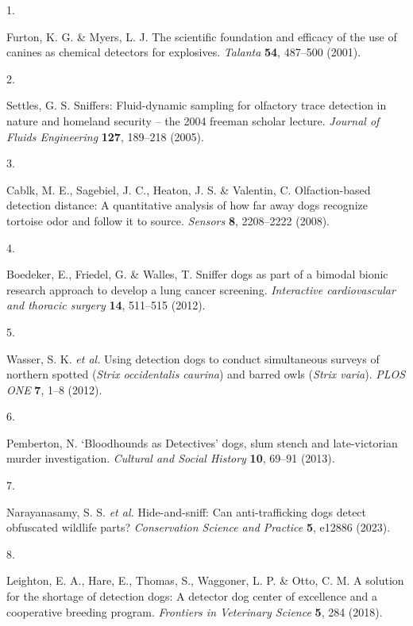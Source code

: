 \documentclass[
]{article}
\newlength{\cslhangindent}
\newlength{\csllabelwidth}
\newlength{\cslentryspacingunit} %
\newenvironment{CSLReferences}[2] %
 {%
  \setlength{\parindent}{0pt}
  \ifodd #1
  \let\oldpar\par
  \def\par{\hangindent=\cslhangindent\oldpar}
  \fi
  \setlength{\parskip}{#2\cslentryspacingunit}
 }%
 {}
\newcommand{\CSLLeftMargin}[1]{\parbox[t]{\csllabelwidth}{#1}}
\newcommand{\CSLRightInline}[1]{\parbox[t]{\linewidth - \csllabelwidth}{#1}\break}
\begin{document}
\hypertarget{refs}{}
\begin{CSLReferences}{0}{0}
\leavevmode{}%
\CSLLeftMargin{1. }%
\CSLRightInline{Furton, K. G. \& Myers, L. J. The scientific foundation and efficacy of the use of canines as chemical detectors for explosives. \emph{Talanta} \textbf{54}, 487--500 (2001).}

\leavevmode{}%
\CSLLeftMargin{2. }%
\CSLRightInline{Settles, G. S. Sniffers: Fluid-dynamic sampling for olfactory trace detection in nature and homeland security -- the 2004 freeman scholar lecture. \emph{Journal of Fluids Engineering} \textbf{127}, 189--218 (2005).}

\leavevmode{}%
\CSLLeftMargin{3. }%
\CSLRightInline{Cablk, M. E., Sagebiel, J. C., Heaton, J. S. \& Valentin, C. Olfaction-based detection distance: A quantitative analysis of how far away dogs recognize tortoise odor and follow it to source. \emph{Sensors} \textbf{8}, 2208--2222 (2008).}

\leavevmode{}%
\CSLLeftMargin{4. }%
\CSLRightInline{Boedeker, E., Friedel, G. \& Walles, T. Sniffer dogs as part of a bimodal bionic research approach to develop a lung cancer screening. \emph{Interactive cardiovascular and thoracic surgery} \textbf{14}, 511--515 (2012).}

\leavevmode{}%
\CSLLeftMargin{5. }%
\CSLRightInline{Wasser, S. K. \emph{et al.} Using detection dogs to conduct simultaneous surveys of northern spotted (\emph{{S}trix occidentalis caurina}) and barred owls (\emph{{S}trix varia}). \emph{PLOS ONE} \textbf{7}, 1--8 (2012).}

\leavevmode{}%
\CSLLeftMargin{6. }%
\CSLRightInline{Pemberton, N. {`{B}loodhounds as {D}etectives'} dogs, slum stench and late-victorian murder investigation. \emph{Cultural and Social History} \textbf{10}, 69--91 (2013).}

\leavevmode{}%
\CSLLeftMargin{7. }%
\CSLRightInline{Narayanasamy, S. S. \emph{et al.} Hide-and-sniff: Can anti-trafficking dogs detect obfuscated wildlife parts? \emph{Conservation Science and Practice} \textbf{5}, e12886 (2023).}

\leavevmode{}%
\CSLLeftMargin{8. }%
\CSLRightInline{Leighton, E. A., Hare, E., Thomas, S., Waggoner, L. P. \& Otto, C. M. A solution for the shortage of detection dogs: A detector dog center of excellence and a cooperative breeding program. \emph{Frontiers in Veterinary Science} \textbf{5}, 284 (2018).}


\end{CSLReferences}
\end{document}
